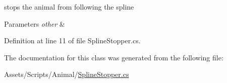 stops the animal from following the spline 


\begin{DoxyParams}{Parameters}
{\em other} & \\
\hline
\end{DoxyParams}


Definition at line 11 of file Spline\+Stopper.\+cs.



The documentation for this class was generated from the following file\+:\begin{DoxyCompactItemize}
\item 
Assets/\+Scripts/\+Animal/\mbox{\hyperlink{_spline_stopper_8cs}{Spline\+Stopper.\+cs}}\end{DoxyCompactItemize}

